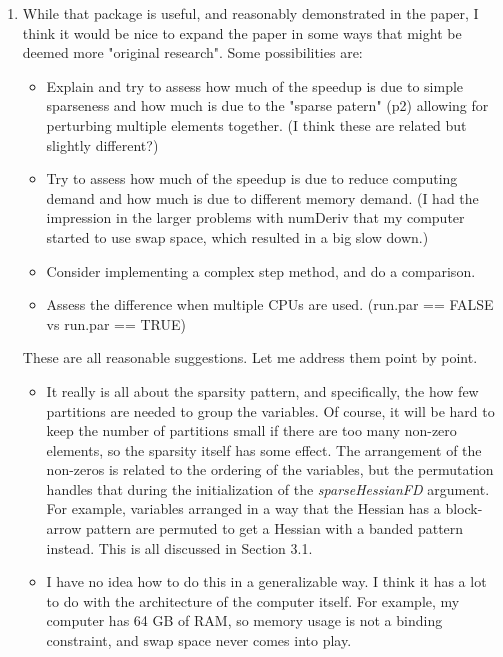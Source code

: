 \documentclass{article}
\newcommand{\class}[1]{\textsl{#1}}
\newenvironment{revQuote}{\itshape}{\vspace{\baselineskip}}
\newenvironment{response}{\normalfont}{\vspace{\baselineskip}}
\begin{document}
\begin{enumerate}[align=left]
\item\begin{revQuote}

While that package is useful, and reasonably demonstrated in the paper,
I think it would be nice to expand the paper in some ways that might be
deemed more "original research". Some possibilities are:
\begin{itemize}
 \item Explain and try to assess how much of the speedup is due to simple
sparseness and how much is due to the "sparse patern" (p2) allowing for
perturbing multiple elements together. (I think these are related but
slightly different?)
 
 \item Try to assess how much of the speedup is due to reduce computing demand
and how much is due to different memory demand. (I had the impression in the
larger problems with numDeriv that my computer started to use swap space,
which resulted in a big slow down.)
 
 \item Consider implementing a complex step method, and do a comparison.
 
 \item  Assess the difference when multiple CPUs are used. (run.par == FALSE vs
run.par == TRUE)
\end{itemize}
  \end{revQuote}
  
  \begin{response}
These are all reasonable suggestions.  Let me address them point by point.
    \begin{itemize}
    \item It really is all about the sparsity pattern, and
      specifically, the how few partitions are needed to group the
      variables.  Of course, it will be hard to keep the number of
      partitions small if there are too many non-zero elements, so the
      sparsity itself has some effect.  The arrangement of the non-zeros is
      related to the ordering of the variables, but the permutation
      handles that during the initialization of the
      \class{sparseHessianFD} argument.  For example, variables
      arranged in a way that the Hessian has a block-arrow pattern are
      permuted to get a Hessian with a banded pattern instead.  This
      is all discussed in Section 3.1.
      
\item I have no idea how to do this in a generalizable way.  I think
  it has a lot to do with the architecture of the computer
  itself.  For example, my computer has 64 GB of RAM, so memory usage
  is not a binding constraint, and swap space never comes into play.


\end{itemize}
\end{response}
\end{enumerate}
\end{document}
